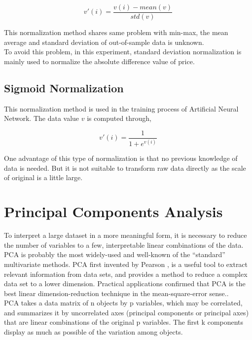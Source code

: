 \begin{equation}
v'(i)=\frac{v(i)-mean(v)}{std(v)}
\end{equation}

This normalization method shares same problem with min-max, the mean average and standard deviation of out-of-sample data is unknown. \\



To avoid this problem, in this experiment, standard deviation normalization is mainly used to normalize the absolute difference value of price.

\subsection{Sigmoid Normalization\cite{nayak2014impact}}
This normalization method is used in the training process of Artificial Neural Network. The data value $v$ is computed through,


\begin{equation}
v'(i)=\frac{1}{1+e^{v(i)}}
\end{equation}

One advantage of this type of normalization is that no previous knowledge of data is needed. But it is not suitable to transform raw data directly as the scale of original is a little large.


\section{Principal Components Analysis}

To interpret a large dataset in a more meaningful form, it is necessary to reduce the number of variables to a few, interpretable linear combinations of the data. PCA is probably the most widely-used and well-known of the “standard” multivariate methods. PCA first invented by Pearson \cite{peason1901lines}, is a useful tool to extract relevant information from data sets, and provides a method to reduce a complex data set to a lower dimension. Practical applications confirmed that PCA is the best linear dimension-reduction technique in the mean-square-error sense.\cite{4_kantardzic}. \\

PCA takes a data matrix of n objects by p variables, which may be correlated, and summarizes it by uncorrelated axes (principal components or principal axes) that are linear combinations of the original p variables. The first k components display as much as possible of the variation among objects.

